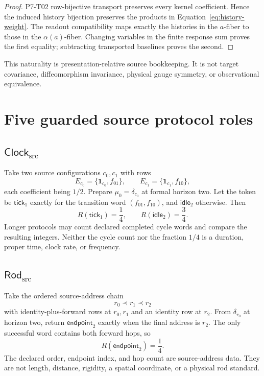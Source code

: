 \documentclass[11pt]{article}
\begin{document}
\begin{proof}
P7-T02 row-bijective transport preserves every kernel coefficient. Hence the
induced history bijection preserves the products in
Equation~\eqref{eq:history-weight}. The readout compatibility maps exactly
the histories in the \(a\)-fiber to those in the \(\alpha(a)\)-fiber.
Changing variables in the finite response sum proves the first equality;
subtracting transported baselines proves the second.
\end{proof}

This naturality is presentation-relative source bookkeeping. It is not
target covariance, diffeomorphism invariance, physical gauge symmetry, or
observational equivalence.

\section{Five guarded source protocol roles}

\subsection{\(\mathsf{Clock}_{\mathrm{src}}\)}

Take two source configurations \(c_0,c_1\) with rows
\[
 E_{c_0}=\{\mathbf1_{c_0},f_{01}\},\qquad
 E_{c_1}=\{\mathbf1_{c_1},f_{10}\},
\]
each coefficient being \(1/2\). Prepare
\(\mu_0=\delta_{c_0}\) at formal horizon two. Let the token be
\(\mathsf{tick}_1\) exactly for the transition word
\((f_{01},f_{10})\), and \(\mathsf{idle}_2\) otherwise. Then
\[
  R(\mathsf{tick}_1)=\frac14,\qquad
  R(\mathsf{idle}_2)=\frac34.
\]
Longer protocols may count declared completed cycle words and compare the
resulting integers. Neither the cycle count nor the fraction \(1/4\) is a
duration, proper time, clock rate, or frequency.

\subsection{\(\mathsf{Rod}_{\mathrm{src}}\)}

Take the ordered source-address chain
\[
  r_0\prec r_1\prec r_2
\]
with identity-plus-forward rows at \(r_0,r_1\) and an identity row at
\(r_2\). From \(\delta_{r_0}\) at horizon two, return
\(\mathsf{endpoint}_2\) exactly when the final address is \(r_2\).
The only successful word contains both forward hops, so
\[
  R(\mathsf{endpoint}_2)=\frac14.
\]
The declared order, endpoint index, and hop count are source-address data.
They are not length, distance, rigidity, a spatial coordinate, or a physical
rod standard.
\end{document}
